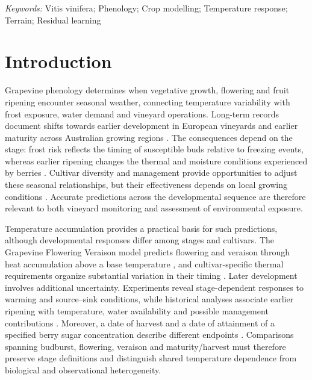 \documentclass[a4paper,12pt]{article}
\let\OriginalSection\section
\renewcommand{\section}{\FloatBarrier\OriginalSection}
\begin{document}
\noindent\textit{Keywords:} Vitis vinifera; Phenology; Crop modelling; Temperature response; Terrain; Residual learning
\par\medskip

\section{Introduction}

Grapevine phenology determines when vegetative growth, flowering and fruit ripening encounter seasonal weather, connecting temperature variability with frost exposure, water demand and vineyard operations. Long-term records document shifts towards earlier development in European vineyards and earlier maturity across Australian growing regions \citep{tomasiGrapevinePhenologyClimate2011,webbObservedMaturity2011}. The consequences depend on the stage: frost risk reflects the timing of susceptible buds relative to freezing events, whereas earlier ripening changes the thermal and moisture conditions experienced by berries \citep{sgubinFrost2018,cookClimateChangeDecouples2016}. Cultivar diversity and management provide opportunities to adjust these seasonal relationships, but their effectiveness depends on local growing conditions \citep{moralesCastillaDiversity2020,vanleeuwenClimateChangeImpacts2024}. Accurate predictions across the developmental sequence are therefore relevant to both vineyard monitoring and assessment of environmental exposure.

Temperature accumulation provides a practical basis for such predictions, although developmental responses differ among stages and cultivars. The Grapevine Flowering Veraison model predicts flowering and veraison through heat accumulation above a base temperature \citep{parkerGeneralPhenologicalModel2011a}, and cultivar-specific thermal requirements organize substantial variation in their timing \citep{parkerClassificationVarietiesTheir2013}. Later development involves additional uncertainty. Experiments reveal stage-dependent responses to warming and source--sink conditions, while historical analyses associate earlier ripening with temperature, water availability and possible management contributions \citep{sadrasNonlinearEffectsElevated2013,webbEarlierRipening2012}. Moreover, a date of harvest and a date of attainment of a specified berry sugar concentration describe different endpoints \citep{parkerTemperatureBasedSugarRipeness2020}. Comparisons spanning budburst, flowering, veraison and maturity/harvest must therefore preserve stage definitions and distinguish shared temperature dependence from biological and observational heterogeneity.
\end{document}
